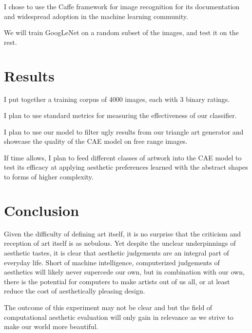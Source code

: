 \documentclass[midd]{thesis}
\begin{document}
I chose to use the Caffe framework for image recognition for its documentation and widespread adoption in the machine learning community.

We will train GoogLeNet on a random subset of the images, and test it on the rest.

\chapter{Results}

I put together a training corpus of 4000 images, each with 3 binary ratings.

I plan to use standard metrics for measuring the effectiveness of our classifier.

I plan to use our model to filter ugly results from our triangle art generator and showcase the quality of the CAE model on free range images.

If time allows, I plan to feed different classes of artwork into the CAE model to test its efficacy at applying aesthetic preferences learned with the abstract shapes to forms of higher complexity.

\chapter{Conclusion}

Given the difficulty of defining art itself, it is no surprise that the criticism and reception of art itself is as nebulous. Yet despite the unclear underpinnings of aesthetic tastes, it is clear that aesthetic judgements are an integral part of everyday life. Short of machine intelligence, computerized judgements of aesthetics will likely never supercede our own, but in combination with our own, there is the potential for computers to make artists out of us all, or at least reduce the cost of aesthetically pleasing design.

The outcome of this experiment may not be clear and but the field of computational aesthetic evaluation will only gain in relevance as we strive to make our world more beautiful.

\end{document}
